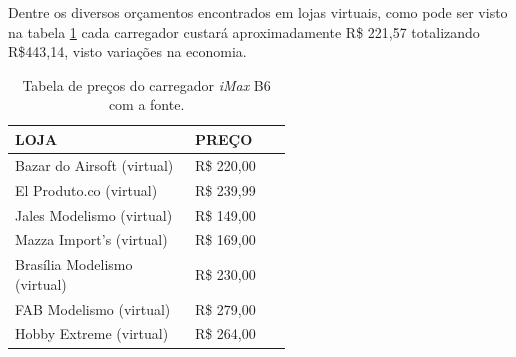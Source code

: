 Dentre os diversos orçamentos encontrados em lojas virtuais, como pode ser visto na tabela \ref{custos_carregador} cada carregador 
custará aproximadamente R\$ 221,57 totalizando R\$443,14, visto variações na economia. 
\pagebreak
\begin{table}[!ht]
    \centering
    \caption{Tabela de preços do carregador \textit{iMax} B6 com a fonte.}
\begin{tabular}{|p{0.40\linewidth}|p{0.15\linewidth}|}
\hline
LOJA & PREÇO \\ \hline
Bazar do Airsoft (virtual) &R\$ 220,00 \\ \hline
El Produto.co (virtual)&R\$ 239,99 \\ \hline
Jales Modelismo (virtual)&R\$ 149,00 \\ \hline
Mazza Import’s (virtual)&R\$ 169,00 \\ \hline
Brasília Modelismo (virtual)&R\$ 230,00 \\ \hline
FAB Modelismo (virtual)&R\$ 279,00 \\ \hline
Hobby Extreme (virtual)&R\$ 264,00 \\ \hline

\end{tabular}
    \label{custos_carregador}
\end{table}
 
